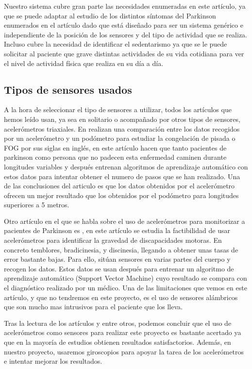 \documentclass[11pt,spanish]{article}
\begin{document}
Nuestro sistema cubre gran parte las necesidades enumeradas en este artículo, ya que se puede adaptar al estudio de los distintos síntomas del Parkinson enumerados en el artículo dado que está diseñado para ser un sistema genérico e independiente de la posición de los sensores y del tipo de actividad que se realiza. Incluso cubre la necesidad de identificar el sedentarismo ya que se le puede solicitar al paciente que grave distintas actividades de su vida cotidiana para ver el nivel de actividad física que realiza en su día a día.
\newline

\subsection{Tipos de sensores usados}
A la hora de seleccionar el tipo de sensores a utilizar, todos los artículos que hemos leído usan, ya sea en solitario o acompañado por otros tipos de sensores, acelerómetros triaxiales. En \cite{resumen3} realizan una comparación entre los datos recogidos por un acelerómetro y un podómetro para estudiar la congelación de pisada o FOG por sus siglas en inglés, en este artículo hacen que tanto pacientes de parkinson como persona que no padecen esta enfermedad caminen durante longitudes variables y después entrenan algoritmos de aprendizaje automático con estos datos para intentar obtener el numero de pasos que se han realizado. Una de las conclusiones del articulo es que los datos obtenidos por el acelerómetro ofrecen un mejor resultado que los obtenidos por el podómetro para longitudes superiores a 5 metros. 
\newline

Otro artículo en el que se habla sobre el uso de acelerómetros para monitorizar a pacientes de Parkinson es \cite{resumen4}, en este artículo se estudia la factibilidad de usar acelerómetros para identificar la gravedad de discapacidades motoras. En concreto temblores, bradicinesia, y discinesia, llegando a obtener unas tasas de error bastante bajas. Para ello, sitúan sensores en varias partes del cuerpo y recogen los datos. Estos datos se usan después para entrenar un algoritmo de aprendizaje automático (Support Vector Machine) cuyo resultado se compara con el diagnóstico realizado por un médico. Una de las limitaciones que vemos en este artículo, y que no tendremos en este proyecto, es el uso de sensores alámbricos que son mucho mas intrusivos para el paciente que los lleva.

Tras la lectura de los artículos \cite{resumen3} y \cite{resumen4} entre otros, podemos concluir que el uso de acelerómetros como sensores para realizar este proyecto es bastante acertado ya que en la mayoría de estudios obtienen resultados satisfactorios. Además, en nuestro proyecto, usaremos giroscopios para apoyar la tarea de los acelerómetros e intentar mejorar los resultados.
\end{document}
